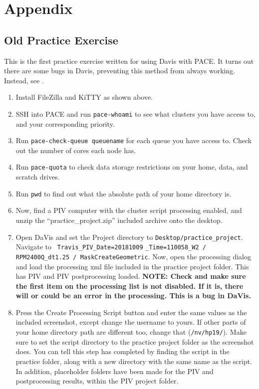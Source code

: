 \documentclass{article}
\newcommand{\quotes}[1]{``#1''}
\begin{document}
    \newpage
	\section{Appendix}
	\subsection{Old Practice Exercise}
	\label{OldExercise}
	This is the first practice exercise written for using Davis with PACE.  It turns out there are some bugs in Davis, preventing this method from always working.  Instead, see .
	
	\begin{enumerate}
		\item Install FileZilla and KiTTY as shown above.
		\item SSH into PACE and run \texttt{pace-whoami} to see what clusters you have access to, and your corresponding priority.
		\item Run \texttt{pace-check-queue queuename} for each queue you have access to. Check out the number of cores each node has.
		\item Run \texttt{pace-quota} to check data storage restrictions on your home, data, and scratch drives.
		\item Run \texttt{pwd} to find out what the absolute path of your home directory is.
		\item Now, find a PIV computer with the cluster script processing enabled, and unzip the \quotes{practice\_project.zip} included archive onto the desktop.
		\item Open DaVis and set the Project directory to \texttt{Desktop/practice\_project}.  Navigate to \texttt{ Travis\_PIV\_Date=20181009} \texttt{\_Time=110058\_W2 / RPM2400Q\_dt1.25 / MaskCreateGeometric}.  Now, open the processing dialog and load the processing xml file included in the practice project folder.  This has PIV and PIV postprocessing loaded.  \textbf{NOTE: Check and make sure the first item on the processing list is not disabled.  If it is, there will or could be an error in the processing.  This is a bug in DaVis.}
		\item Press the Create Processing Script button and enter the same values as the included screenshot, except change the username to yours.  If other parts of your home directory path are different too, change that (\texttt{/nv/hp19/}).  Make sure to set the script directory to the practice project folder as the screenshot does.  You can tell this step has completed by finding the script in the practice folder, along with a new directory with the same name as the script.  In addition, placeholder folders have been made for the PIV and postprocessing results, within the PIV project folder.

\end{enumerate}
\end{document}
